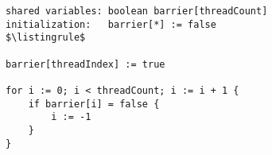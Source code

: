 \begin{lstlisting}[mathescape]
shared variables: boolean barrier[threadCount]
initialization:   barrier[*] := false
$\listingrule$

barrier[threadIndex] := true

for i := 0; i < threadCount; i := i + 1 {
	if barrier[i] = false {
		i := -1
	}
}
\end{lstlisting}
